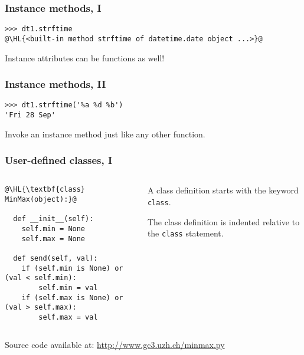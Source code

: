 \documentclass[english,serif,mathserif,xcolor=pdftex,dvipsnames,table]{beamer}
\begin{document}
\begin{frame}[fragile]
  \frametitle{Instance methods, I}
\begin{lstlisting}
>>> dt1.strftime
@\HL{<built-in method strftime of datetime.date object ...>}@
\end{lstlisting}

  \+ 
  Instance attributes can be functions as well!
\end{frame}


\begin{frame}[fragile]
  \frametitle{Instance methods, II}
\begin{lstlisting}[showstringspaces=false]
>>> dt1.strftime('%a %d %b')
'Fri 28 Sep'
\end{lstlisting}

  \+ 
  Invoke an instance method just like any other function.
\end{frame}




\begin{frame}[fragile]
  \frametitle{User-defined classes, I}
  \begin{columns}[t]
    \begin{column}{0.5\textwidth}
\begin{lstlisting}
@\HL{\textbf{class} MinMax(object):}@

  def __init__(self):
    self.min = None
    self.max = None

  def send(self, val):
    if (self.min is None) or (val < self.min):
        self.min = val
    if (self.max is None) or (val > self.max):
        self.max = val
\end{lstlisting}
    \end{column}
    \begin{column}{0.5\textwidth}
      \raggedleft 
      A class definition starts with the keyword \texttt{class}.

      The class definition is indented relative to the \texttt{class}
      statement.
    \end{column}
  \end{columns}

  \+
  {\scriptsize Source code available at:
    \url{http://www.gc3.uzh.ch/minmax.py}}
\end{frame}
\end{document}
